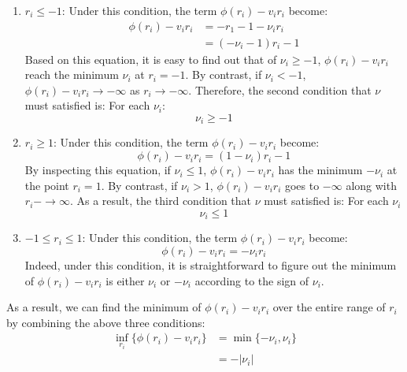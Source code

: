 \documentclass[10pt,a4paper]{article}
\begin{document}
\begin{enumerate}
	\item $r_{i} \leq -1$: Under this condition, the term $\phi(r_{i}) - v_{i} r_{i}$ become:
	\begin{equation*}
		\begin{aligned}
			\phi(r_{i}) - v_{i} r_{i} &= -r_{1} - 1 - \nu_{i} r_{i} \\
			&= (-\nu_{i} - 1) r_{i} - 1
		\end{aligned}
	\end{equation*}
	Based on this equation, it is easy to find out that of $\nu_{i} \geq -1$, $\phi(r_{i}) - v_{i} r_{i}$ reach the minimum $\nu_{i}$ at $r_{i} = -1$. By contrast, if $\nu_{i} < -1$, $\phi(r_{i}) - v_{i} r_{i} \rightarrow -\infty$ as $r_{i} \rightarrow -\infty$. Therefore, the second condition that $\nu$ must satisfied is: For each $\nu_{i}$:
	\begin{equation}
		\nu_{i} \geq -1
	\end{equation}
	\item $r_{i} \geq 1$: Under this condition, the term $\phi(r_{i}) - v_{i} r_{i}$ become:
	\begin{equation*}
		\phi(r_{i}) - v_{i} r_{i} = (1 - \nu_{i}) r_{i} - 1
	\end{equation*}
	By inspecting this equation, if $\nu_{i} \leq 1$, $\phi(r_{i}) - v_{i} r_{i}$ has the minimum $-\nu_{i}$ at the point $r_{i} = 1$. By contrast, if $\nu_{i} > 1$, $\phi(r_{i}) - v_{i} r_{i}$ goes to $-\infty$ along with $r_{i} -\rightarrow \infty$. As a result, the third condition that $\nu$ must satisfied is: For each $\nu_{i}$
	\begin{equation}
		\nu_{i} \leq 1
	\end{equation}
	\item $-1 \leq r_{i} \leq 1$: Under this condition, the term $\phi(r_{i}) - v_{i} r_{i}$ become:
	\begin{equation*}
		\phi(r_{i}) - v_{i} r_{i} = -\nu_{i} r_{i}
	\end{equation*}
	Indeed, under this condition, it is straightforward to figure out the minimum of $\phi(r_{i}) - v_{i} r_{i}$ is either $\nu_{i}$ or $-\nu_{i}$ according to the sign of $\nu_{i}$.
\end{enumerate}
As a result, we can find the minimum of $\phi(r_{i}) - v_{i} r_{i}$ over the entire range of $r_{i}$ by combining the above three conditions:
\begin{equation}
	\begin{aligned}
		\displaystyle\inf_{r_{i}}\{ \phi(r_{i}) - v_{i} r_{i} \} &= \displaystyle\min \{ -\nu_{i}, \nu_{i} \} \\
		&= - |\nu_{i}|
	\end{aligned}
	\label{inf}	
\end{equation}
\end{document}
